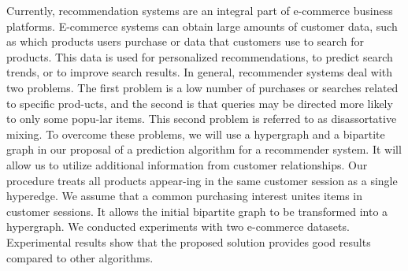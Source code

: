 
\begin{Abstrakt}
    Currently, recommendation systems are an integral part of e-commerce business platforms. E-commerce systems can obtain large amounts of customer data, such as which products users purchase or data that customers use to search for products. This data is used for personalized recommendations, to predict search trends, or to improve search results. In general, recommender systems deal with two problems. The first problem is a low number of purchases or searches related to specific prod-ucts, and the second is that queries may be directed more likely to only some popu-lar items. This second problem is referred to as disassortative mixing. To overcome these problems, we will use a hypergraph and a bipartite graph in our proposal of a prediction algorithm for a recommender system. It will allow us to utilize additional information from customer relationships. Our procedure treats all products appear-ing in the same customer session as a single hyperedge. We assume that a common purchasing interest unites items in customer sessions. It allows the initial bipartite graph to be transformed into a hypergraph. We conducted experiments with two e-commerce datasets. Experimental results show that the proposed solution provides good results compared to other algorithms.
\end{Abstrakt}



\clearpage